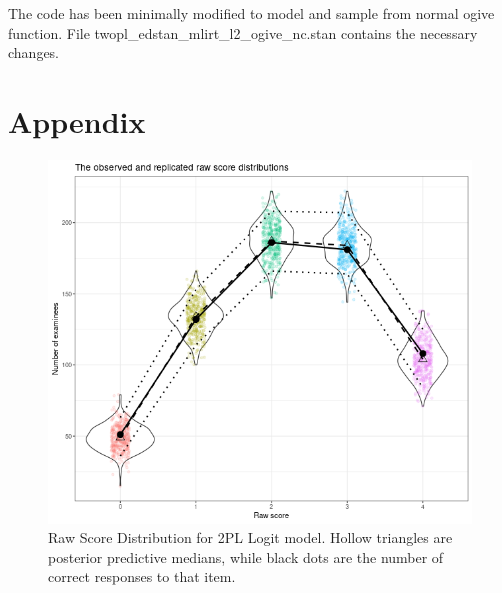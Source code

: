 \documentclass[12pt]{article}
\begin{document}
The code has been minimally modified to model and sample from normal ogive function.
File twopl\_edstan\_mlirt\_l2\_ogive\_nc.stan contains the necessary changes.





\newpage
\section*{Appendix}

\begin{figure}[h]
\vspace{-0.5cm}
  \centering
  \includegraphics[width=1\columnwidth]{Plots/Plots_2PL_Logit/raw_score_dist.png}
  \caption{Raw Score Distribution for 2PL Logit model. Hollow triangles are posterior predictive medians, while black dots are the number of correct responses to that item.}
  \label{2pl_logit_raw_score}
\end{figure}
\end{document}
